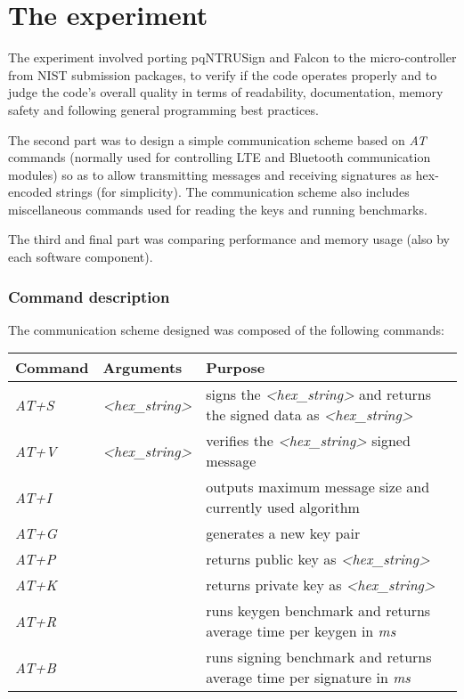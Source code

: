 \documentclass[
]{article}
\begin{document}
\hypertarget{the-experiment}{%
\part{The experiment}
\label{the-experiment}}

The experiment involved porting pqNTRUSign and Falcon to the micro-controller from NIST submission packages, to verify if the code operates properly and to judge the code's overall quality in terms of readability, documentation, memory safety and following general programming best practices.

The second part was to design a simple communication scheme based on \textit{AT} commands (normally used for controlling LTE and Bluetooth communication modules) so as to allow transmitting messages and receiving signatures as hex-encoded strings (for simplicity). The communication scheme also includes miscellaneous commands used for reading the keys and running benchmarks.

The third and final part was comparing performance and memory usage (also by each software component).

\hypertarget{at-commands}{%
\section{Command description}\label{at-commands}}

The communication scheme designed was composed of the following commands:

\begin{longtable}[]{@{}llll@{}}
\toprule
Command & Arguments & Purpose\tabularnewline
\midrule
\endhead
\textit{AT+S} & \textit{<hex\_string>} &
signs the \textit{<hex\_string>} and returns the signed data as \textit{<hex\_string>}
\tabularnewline
\textit{AT+V} & \textit{<hex\_string>} &
verifies the \textit{<hex\_string>} signed message
\tabularnewline
\textit{AT+I} & &
outputs maximum message size and currently used algorithm
\tabularnewline
\textit{AT+G} & &
generates a new key pair
\tabularnewline
\textit{AT+P} & &
returns public key as \textit{<hex\_string>}
\tabularnewline
\textit{AT+K} & &
returns private key as \textit{<hex\_string>}
\tabularnewline
\textit{AT+R} & &
runs keygen benchmark and returns average time per keygen in \textit{ms}
\tabularnewline
\textit{AT+B} & &
runs signing benchmark and returns average time per signature in \textit{ms}
\tabularnewline
\bottomrule
\end{longtable}
\end{document}
